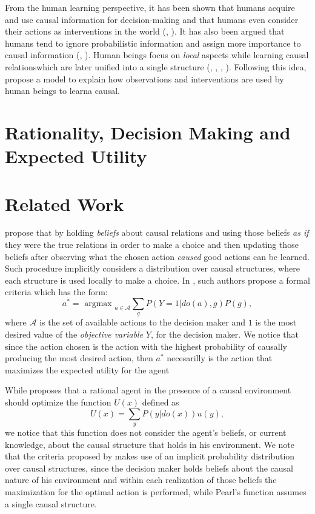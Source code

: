 \documentclass[letterpaper]{article}
\begin{document}
From the human learning perspective, it has been shown that humans acquire and use causal information for decision-making and that humans even consider their actions as interventions in the world (\cite{hagmayer2009decision}, \cite{wellen2012learning} \cite{hagmayer2013repeated}). It has also been argued that humans tend to ignore probabilistic information and assign more importance to causal information (\cite{tversky1980causal}, \cite{pearl2009causality}). Human beings focus on \textit{local} aspects while learning causal relationswhich are later unified into a single structure (\cite{fernbach2009causal}, \cite{waldmann2008causal}, \cite{wellen2012learning}, \cite{danks2014unifying}). Following this idea, \cite{wellen2012learning} propose a model to explain how observations  and interventions are used by human beings to learna causal. 

\section{Rationality, Decision Making and Expected Utility}

\section{Related Work}
\cite{gonzalez2018playing} propose that by holding \textit{beliefs} about causal relations and using those beliefs \textit{as if} they were the true relations in order to make a choice and then updating those beliefs after observing what the chosen action \textit{caused} good actions can be learned. Such procedure implicitly considers a distribution over causal structures, where each structure is used locally to make a choice. In \cite{2019arXiv190202279G}, such authors propose a formal criteria which has the form:
\[  a^\ast = \textrm{ argmax }_{a \in \mathcal{A}}\sum_g P(Y=1 | do(a), g)P(g), \]
where $\mathcal{A}$ is the set of available actions to the decision maker and $1$ is the most desired value of the \textit{objective variable} $Y$, for the decision maker. We notice that since the action chosen is the action with the highest probability of causally producing the most desired action, then $a^\ast$ necesarilly is the action that maximizes the expected utility for the agent

While \cite{pearl2009causality} proposes that a rational agent in the presence of a causal environment should optimize the function $U(x)$ defined as 
\[ U(x)=\sum_y P(y | do(x)) u(y), \]
we notice that this function does not consider the agent's beliefs, or current knowledge, about the causal structure that holds in his environment. We note that the criteria proposed by \cite{2019arXiv190202279G} makes use of an implicit probability distribution over causal structures, since the decision maker holds beliefs about the causal nature of his environment and within each realization of those beliefs the maximization for the optimal action is performed, while Pearl's function assumes a single causal structure.
\end{document}
